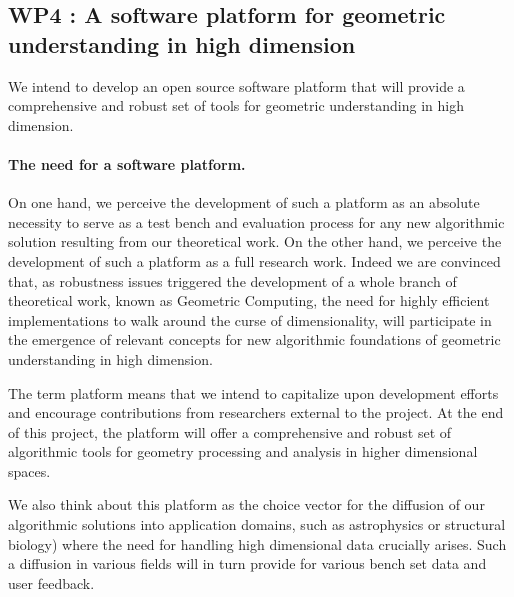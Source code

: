 
\subsection*{WP4 : A software platform for geometric understanding in high
  dimension}

We intend to develop an open source  software platform that will provide a
comprehensive and robust set of tools for geometric understanding in
high
dimension. 

\paragraph{The need for a software platform.}
On one hand, we perceive the development of such a platform as 
an absolute necessity to serve as a test bench and  evaluation process
for any new algorithmic solution resulting  from  our theoretical work.
On the other hand, we perceive the development of such a platform as
a full research work. Indeed we are convinced that, as robustness
issues triggered the development of a whole branch of theoretical
work, known as Geometric Computing, the need for
highly efficient implementations to walk around the curse of  
dimensionality,  will participate in the emergence of relevant
concepts for new algorithmic foundations
of  geometric understanding in high dimension.


The term platform means that we intend to capitalize upon development
efforts and encourage contributions from researchers external to the
project.  At the end of this project, the platform will offer a
comprehensive and robust set of algorithmic tools for geometry
processing and analysis in higher dimensional spaces.

We also think about this platform as the choice
vector for the diffusion of our algorithmic solutions 
into application domains, such as astrophysics
or structural biology) 
 where the need for handling high dimensional
data crucially arises.  Such a diffusion in various fields
 will in turn provide for various bench set data 
and user feedback.



